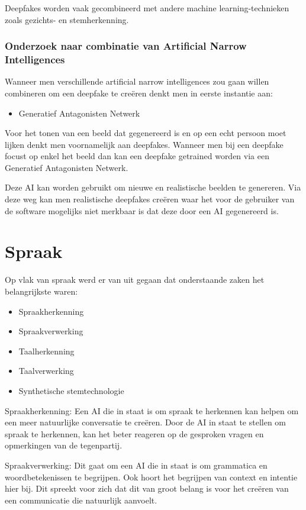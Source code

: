 Deepfakes worden vaak gecombineerd met andere machine learning-technieken zoals gezichts- en stemherkenning.

\subsubsection{Onderzoek naar combinatie van Artificial Narrow Intelligences}

Wanneer men verschillende artificial narrow intelligences zou gaan willen combineren om een deepfake te creëren denkt men in eerste instantie aan:

\begin{itemize}
    \item Generatief Antagonisten Netwerk
\end{itemize}

Voor het tonen van een beeld dat gegenereerd is en op een echt persoon moet lijken denkt men voornamelijk aan deepfakes. Wanneer men bij een deepfake focust op enkel het beeld dan kan een deepfake getrained worden via een Generatief Antagonisten Netwerk.

Deze AI kan worden gebruikt om nieuwe en realistische beelden te genereren. Via deze weg kan men realistische deepfakes creëren waar het voor de gebruiker van de software mogelijks niet merkbaar is dat deze door een AI gegenereerd is.

\section{Spraak}

Op vlak van spraak werd er van uit gegaan dat onderstaande zaken het belangrijkste waren:

\begin{itemize}
    \item Spraakherkenning
    \item Spraakverwerking
    \item Taalherkenning
    \item Taalverwerking
    \item Synthetische stemtechnologie
\end{itemize}

Spraakherkenning: Een AI die in staat is om spraak te herkennen kan helpen om een meer natuurlijke conversatie te creëren. Door de AI in staat te stellen om spraak te herkennen, kan het beter reageren op de gesproken vragen en opmerkingen van de tegenpartij.

Spraakverwerking: Dit gaat om een AI die in staat is om grammatica en woordbetekenissen te begrijpen. Ook hoort het begrijpen van context en intentie hier bij. Dit spreekt voor zich dat dit van groot belang is voor het creëren van een communicatie die natuurlijk aanvoelt.

